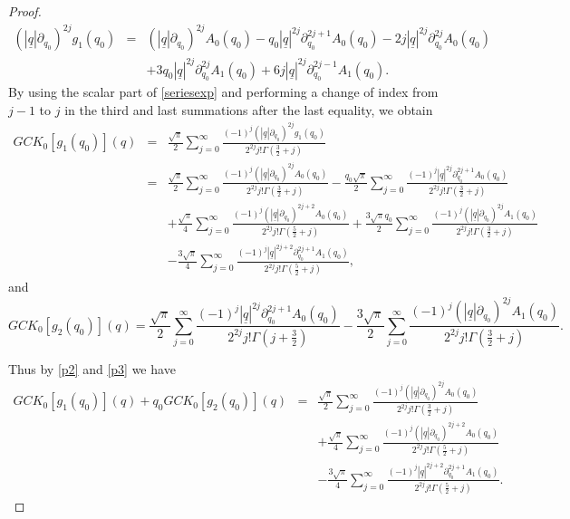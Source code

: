 \documentclass[10pt,a4paper]{amsart}
\begin{document}
\begin{proof}
\begin{eqnarray}
\nonumber
(|\underline{q}| \partial_{q_0})^{2 j} g_1(q_0)&=& (|\underline{q}| \partial_{q_0})^{2 j}A_0(q_0)-q_0 | \underline{q}|^{2 j} \partial_{q_0}^{2 j +1} A_0(q_0)-2 j | \underline{q}|^{2 j} \partial_{q_0}^{2 j} A_0(q_0)\\
\label{rev1}
&&+3 q_0| \underline{q}|^{2 j} \partial_{q_0}^{2 j} A_1(q_0)+6 j | \underline{q}|^{2 j} \partial_{q_0}^{2 j -1}A_1(q_0) .
\end{eqnarray}
By using the scalar part of \eqref{seriesexp} and performing a change of index from $j-1$ to $j$ in the third and last summations after the last equality, we obtain
\begin{eqnarray}
	\nonumber
GCK_0[g_1(q_0)](q)&=& \frac{\sqrt{\pi}}{2} \sum_{j=0}^\infty \frac{(-1)^j (|\underline{q}| \partial_{q_0})^{2j}g_1(q_0)}{2^{2j}j! \Gamma \left(\frac{3}{2}+j\right)}\\
\nonumber
&=& \frac{\sqrt{\pi}}{2} \sum_{j=0}^\infty \frac{(-1)^j (|\underline{q}| \partial_{q_0})^{2j}A_0(q_0)}{2^{2j}j! \Gamma \left(\frac{3}{2}+j\right)}-\frac{q_0\sqrt{\pi}}{2} \sum_{j=0}^\infty \frac{(-1)^j |\underline{q}|^{2j} \partial_{q_0}^{2j+1}A_0(q_0)}{2^{2j}j! \Gamma \left(\frac{3}{2}+j\right)}\\
\nonumber
&&+ \frac{\sqrt{\pi}}{4} \sum_{j=0}^\infty \frac{(-1)^j (|\underline{q}| \partial_{q_0})^{2j+2} A_0(q_0)}{2^{2j}j! \Gamma \left(\frac{5}{2}+j\right)}+\frac{3 \sqrt{\pi}q_0}{2}\sum_{j=0}^\infty \frac{(-1)^j (|\underline{q}| \partial_{q_0})^{2j}A_1(q_0)}{2^{2j}j! \Gamma \left(\frac{3}{2}+j\right)}\\
\label{p2}
&&-\frac{3 \sqrt{\pi}}{4} \sum_{j=0}^\infty \frac{(-1)^j | \underline{q}|^{2j+2} \partial_{q_0}^{2j+1}A_1(q_0)}{2^{2j} j! \Gamma \left( \frac{5}{2}+j\right)},
\end{eqnarray}
and
\begin{equation}
\label{p3}
GCK_0[g_2(q_0)](q)= \frac{\sqrt{\pi}}{2} \sum_{j=0}^\infty \frac{(-1)^j | \underline{q}|^{2j} \partial_{q_0}^{2j+1}A_0(q_0)}{2^{2j}j! \Gamma \left(j+\frac{3}{2}\right)}- \frac{3 \sqrt{\pi}}{2} \sum_{j=0}^\infty \frac{(-1)^j (|\underline{q}| \partial_{q_0})^{2j}A_1(q_0)}{2^{2j}j! \Gamma \left(\frac{3}{2}+j\right)}.
\end{equation}

Thus by \eqref{p2} and \eqref{p3} we have
\begin{eqnarray}
\nonumber
GCK_0[g_1(q_0)](q)+q_0GCK_0[g_2(q_0)](q)&=&\frac{\sqrt{\pi}}{2} \sum_{j=0}^\infty \frac{(-1)^j (|\underline{q}| \partial_{q_0})^{2j}A_0(q_0)}{2^{2j}j! \Gamma \left(\frac{3}{2}+j\right)}\\
\nonumber
&&+ \frac{\sqrt{\pi}}{4} \sum_{j=0}^\infty \frac{(-1)^j (|\underline{q}| \partial_{q_0})^{2j+2} A_0(q_0)}{2^{2j}j! \Gamma \left(\frac{5}{2}+j\right)}\\
\label{scal}
	&&-\frac{3 \sqrt{\pi}}{4} \sum_{j=0}^\infty \frac{(-1)^j | \underline{q}|^{2j+2} \partial_{q_0}^{2j+1}A_1(q_0)}{2^{2j} j! \Gamma \left( \frac{5}{2}+j\right)}.
\end{eqnarray}



\end{proof}
\end{document}
